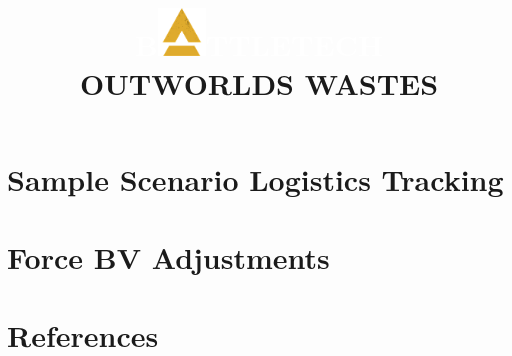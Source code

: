 \documentclass{article}
\begin{document}
\newpage

\section{Sample Scenario Logistics Tracking}



\newpage

\section{Force BV Adjustments}
\label{sec:force_bv_adjustments}



\section{References}
\label{sec:references}



\newpage


\clearpage

\title{
  \selectfont
  \fontsize{50}{60}\selectfont\textcolor{white}{\MakeUppercase{B}}\includegraphics[alt='a', width=0.5in]{img/Battletech-A.png}\fontsize{50}{60}\selectfont\textcolor{white}{\MakeUppercase{ttleTech}}\\
  \fontsize{35}{42}\selectfont\MakeUppercase{Outworlds Wastes}
}

\maketitle
\end{document}
